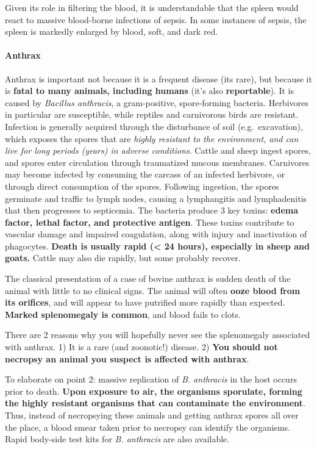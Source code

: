 \documentclass[openany]{article}
\let\oldparagraph\paragraph
\renewcommand{\paragraph}[1]{\oldparagraph{#1}\mbox{}}
\begin{document}
Given its role in filtering the blood, it is understandable that the
spleen would react to massive blood-borne infections of sepsis. In some
instances of sepsis, the spleen is markedly enlarged by blood, soft, and
dark red.

\paragraph{Anthrax}\label{anthrax}

Anthrax is important not because it is a frequent disease (its rare),
but because it is \textbf{fatal to many animals, including humans} (it's
also \textbf{reportable}). It is caused by \emph{Bacillus anthracis}, a
gram-positive, spore-forming bacteria. Herbivores in particular are
susceptible, while reptiles and carnivorous birds are resistant.
Infection is generally acquired through the disturbance of soil
(e.g.~excavation), which exposes the spores that are \emph{highly
resistant to the environment, and can live for long periods (years) in
adverse conditions}. Cattle and sheep ingest spores, and spores enter
circulation through traumatized mucous membranes. Carnivores may become
infected by consuming the carcass of an infected herbivore, or through
direct consumption of the spores. Following ingestion, the spores
germinate and traffic to lymph nodes, causing a lymphangitis and
lymphadenitis that then progresses to septicemia. The bacteria produce 3
key toxins: \textbf{edema factor, lethal factor, and protective
antigen}. These toxins contribute to vascular damage and impaired
coagulation, along with injury and inactivation of phagocytes.
\textbf{Death is usually rapid (\textless{} 24 hours), especially in
sheep and goats.} Cattle may also die rapidly, but some probably
recover.

The classical presentation of a case of bovine anthrax is sudden death
of the animal with little to no clinical signs. The animal will often
\textbf{ooze blood from its orifices}, and will appear to have putrified
more rapidly than expected. \textbf{Marked splenomegaly is common}, and
blood fails to clots.

There are 2 reasons why you will hopefully never see the splenomegaly
associated with anthrax. 1) It is a rare (and zoonotic!) disease. 2)
\textbf{You should not necropsy an animal you suspect is affected with
anthrax}.

To elaborate on point 2: massive replication of \emph{B. anthracis} in
the host occurs prior to death. \textbf{Upon exposure to air, the
organisms sporulate, forming the highly resistant organisms that can
contaminate the environment}. Thus, instead of necropsying these animals
and getting anthrax spores all over the place, a blood smear taken prior
to necropsy can identify the organisms. Rapid body-side test kits for
\emph{B. anthracis} are also available.
\end{document}
